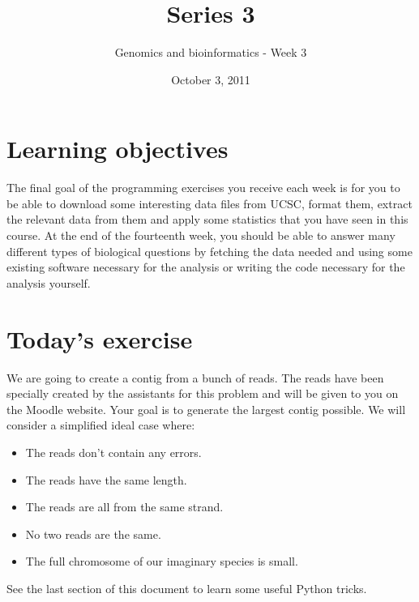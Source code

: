 \documentclass[a4paper,11pt]{article}
\title{Series 3}
\date{October 3, 2011}
\author{Genomics and bioinformatics - Week 3}
\begin{document}
\maketitle

\section{Learning objectives}
The final goal of the programming exercises you receive each week is for you to be able to download some interesting data files from UCSC, format them, extract the relevant data from them and apply some statistics that you have seen in this course. At the end of the fourteenth week, you should be able to answer many different types of biological questions by fetching the data needed and using some existing software necessary for the analysis or writing the code necessary for the analysis yourself.

\section{Today's exercise}
We are going to create a contig from a bunch of reads. The reads have been specially created by the assistants for this problem and will be given to you on the Moodle website. Your goal is to generate the largest contig possible. We will consider a simplified ideal case where:
\begin{itemize}
\item The reads don't contain any errors.
\item The reads have the same length.
\item The reads are all from the same strand.
\item No two reads are the same.
\item The full chromosome of our imaginary species is small.
\end{itemize}
See the last section of this document to learn some useful Python tricks.
\end{document}
